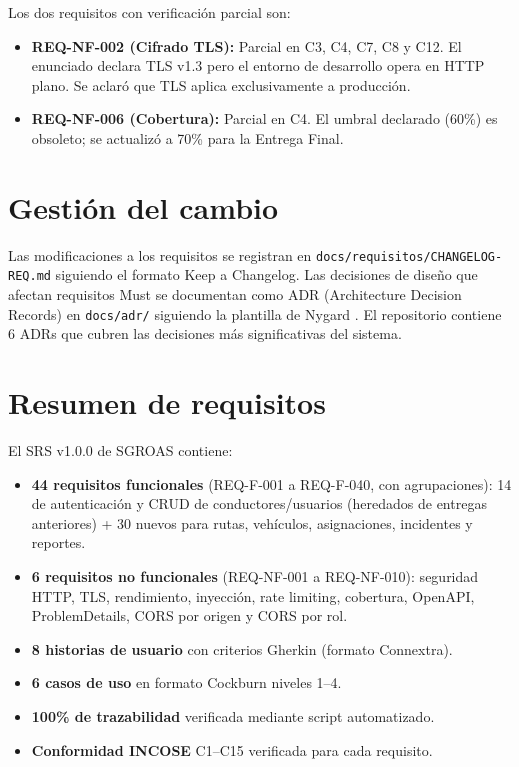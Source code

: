 Los dos requisitos con verificación parcial son:
\begin{itemize}
  \item \textbf{REQ-NF-002 (Cifrado TLS):} Parcial en C3, C4, C7, C8 y C12. El enunciado declara TLS v1.3 pero el entorno de desarrollo opera en HTTP plano. Se aclaró que TLS aplica exclusivamente a producción.
  \item \textbf{REQ-NF-006 (Cobertura):} Parcial en C4. El umbral declarado (60\%) es obsoleto; se actualizó a 70\% para la Entrega Final.
\end{itemize}

\section{Gestión del cambio}
\label{sec:change-management}

Las modificaciones a los requisitos se registran en \texttt{docs/requisitos/CHANGELOG-REQ.md} siguiendo el formato Keep a Changelog. Las decisiones de diseño que afectan requisitos Must se documentan como ADR (Architecture Decision Records) en \texttt{docs/adr/} siguiendo la plantilla de Nygard \cite{nygard2017}. El repositorio contiene 6 ADRs que cubren las decisiones más significativas del sistema.

\section{Resumen de requisitos}
\label{sec:req-summary}

El SRS v1.0.0 de SGROAS contiene:
\begin{itemize}
  \item \textbf{44 requisitos funcionales} (REQ-F-001 a REQ-F-040, con agrupaciones): 14 de autenticación y CRUD de conductores/usuarios (heredados de entregas anteriores) + 30 nuevos para rutas, vehículos, asignaciones, incidentes y reportes.
  \item \textbf{6 requisitos no funcionales} (REQ-NF-001 a REQ-NF-010): seguridad HTTP, TLS, rendimiento, inyección, rate limiting, cobertura, OpenAPI, ProblemDetails, CORS por origen y CORS por rol.
  \item \textbf{8 historias de usuario} con criterios Gherkin (formato Connextra).
  \item \textbf{6 casos de uso} en formato Cockburn niveles 1--4.
  \item \textbf{100\% de trazabilidad} verificada mediante script automatizado.
  \item \textbf{Conformidad INCOSE} C1--C15 verificada para cada requisito.
\end{itemize}
